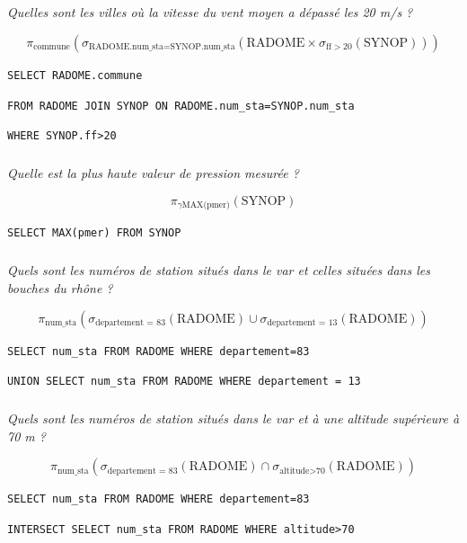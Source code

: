 \documentclass[10pt,fleqn]{article} %
\begin{document}
\subparagraph{}
\textit{Quelles sont les villes où la vitesse du vent moyen a dépassé les 20 m/s ? }
\ifprof
\begin{corrige}
$$ \pi_{\text{commune}}\left(\sigma_{\text{RADOME.num\_sta=SYNOP.num\_sta}} \left(\text{RADOME} \times \sigma_{\text{ff}>20}\left(\text{SYNOP} \right) \right)\right) $$

\hspace{1cm} \texttt{SELECT RADOME.commune}

\hspace{2cm} \texttt{FROM RADOME JOIN SYNOP ON RADOME.num\_sta=SYNOP.num\_sta}

\hspace{2cm} \texttt{WHERE SYNOP.ff>20}

\end{corrige}
\else
\fi
\subparagraph{}
\textit{Quelle est la plus haute valeur de pression mesurée ?}
\ifprof
\begin{corrige}
$$ \pi_{\gamma \text{MAX(pmer)}}\left(\text{SYNOP}\right) $$

\begin{center}
\texttt{SELECT MAX(pmer) FROM SYNOP}
\end{center}

\end{corrige}
\else
\fi
\subparagraph{}
\textit{Quels sont les numéros de station situés dans le var et celles situées dans les bouches du rhône ?}
\ifprof
\begin{corrige}
$$ \pi_{\text{num\_sta}}\left(\sigma_{\text{departement = 83}} \left(\text{RADOME}\right) \cup \sigma_{\text{departement = 13}} \left(\text{RADOME}\right) \right) $$

\hspace{1cm} \texttt{SELECT num\_sta FROM RADOME WHERE departement=83}

\hspace{2cm} \texttt{UNION SELECT num\_sta FROM RADOME WHERE departement = 13}

\end{corrige}
\else
\fi
\subparagraph{}
\textit{Quels sont les numéros de station situés dans le var et à une altitude supérieure à 70 m ? }
\ifprof
\begin{corrige}
$$ \pi_{\text{num\_sta}}\left(\sigma_{\text{departement = 83}} \left(\text{RADOME}\right) \cap \sigma_{\text{altitude>70}} \left(\text{RADOME}\right) \right) $$

\hspace{1cm} \texttt{SELECT num\_sta FROM RADOME WHERE departement=83}

\hspace{2cm} \texttt{INTERSECT SELECT num\_sta FROM RADOME WHERE altitude>70}
\end{corrige}
\end{document}
